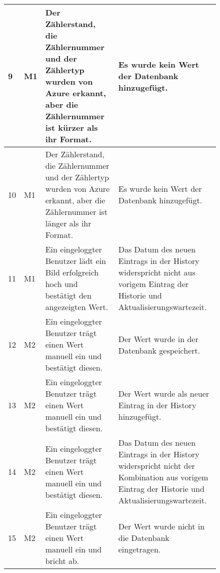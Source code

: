 	\begin{figure}[!h]
		\begin{center}
			\begin{tabularx}{\textwidth}{ p{} | p{} | p{} | X }
				\hline
				9 & M1 & Der Zählerstand, die Zählernummer und der Zählertyp wurden von Azure erkannt, aber die Zählernummer ist kürzer als ihr Format.  & Es wurde kein Wert der Datenbank hinzugefügt. \\ \hline
				10 & M1 & Der Zählerstand, die Zählernummer und der Zählertyp wurden von Azure erkannt, aber die Zählernummer ist länger als ihr Format.  & Es wurde kein Wert der Datenbank hinzugefügt. \\ \hline
				11 & M1 & Ein eingeloggter Benutzer lädt ein Bild erfolgreich hoch und bestätigt den angezeigten Wert.  & Das Datum des neuen Eintrags in der History widerspricht nicht aus vorigem Eintrag der Historie und Aktualisierungswartezeit. \\ \hline
				12 & M2 & Ein eingeloggter Benutzer trägt einen Wert manuell ein und bestätigt diesen. & Der Wert wurde in der Datenbank gespeichert. \\ \hline
				13 & M2 & Ein eingeloggter Benutzer trägt einen Wert manuell ein und bestätigt diesen. & Der Wert wurde als neuer Eintrag in der History hinzugefügt. \\ \hline
				14 & M2 & Ein eingeloggter Benutzer trägt einen Wert manuell ein und bestätigt diesen. & Das Datum des neuen Eintrags in der History widerspricht nicht der Kombination aus vorigem Eintrag der Historie und Aktualisierungswartezeit. \\ \hline
				15 & M2 & Ein eingeloggter Benutzer trägt einen Wert  manuell ein und bricht ab. & Der Wert wurde nicht in die Datenbank eingetragen. \\ \hline
			\end{tabularx}	
		\end{center}
		\end{figure}
		
